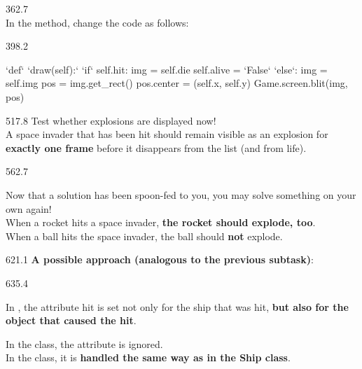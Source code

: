 \documentclass{aslab}
\newcommand*\Kw[1]{\textcolor{codeorange}{#1}}  %
\newcommand*\Cy[1]{\textcolor{codecyan}{#1}}    %
\newcommand*\Bl[1]{\textcolor{aslabblue}{#1}}   %
\begin{document}
\begin{region}[x=92.7,right=0,pitch=17.9]{362.7}
\tcode{self.hit = }{\ttfamily\Cy{False}}\\
In the  method, change the code as follows:
\end{region}

\begin{region}[x=96.7,right=0,pitch=12]{398.2}
\begin{codeblock}[escapechar=`]
`\Kw{def}` `\Cy{draw}\Bl{(self):}`
    `\Kw{if}` self.hit:
        img = self.die
        self.alive = `\Cy{False}`
    `\Kw{else}`:
        img = self.img
    pos = img.get_rect()
    pos.center = (self.x, self.y)
    Game.screen.blit(img, pos)
\end{codeblock}
\end{region}

\begin{region}[x=92.7,right=0,pitch=13.7]{517.8}
Test whether explosions are displayed now!\\
A space invader that has been hit should remain visible as an explosion for
\textbf{exactly one frame} before it disappears from the list (and from
life).
\end{region}

\begin{region}[pitch=15.5]{562.7}
\begin{plaintasks}[start=3]
\item Now that a solution has been spoon-fed to you, you may solve something
  on your own again! \\[-1.2bp]
  When a rocket hits a space invader, \textbf{the rocket should explode,
  too}.\\[-1.2bp]
  When a ball hits the space invader, the ball should \textbf{not} explode.
\end{plaintasks}
\end{region}

\begin{region}[x=74.7,right=0]{621.1}
\textbf{A possible approach (analogous to the previous subtask)}:
\end{region}

\begin{region}[x=74.7,right=0,pitch=14.1]{635.4}
\begin{steps}
\item In , the attribute hit is set not only for the ship
  that was hit, \textbf{but also for the object that caused the hit}.
\item In the  class, the  attribute is ignored.\\
  In the  class, it is \textbf{handled the same way as in the
  Ship class}.
\end{steps}
\end{region}
\end{document}
